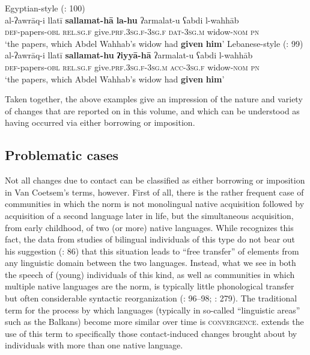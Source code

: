 \documentclass[output=paper]{langsci/langscibook}
\begin{document}
\ea
\label{introwilmsen1}Egyptian-style  (\citealt{Wilmsen2010}: 100)\\
\gll al-ʔawrāq-i llatī \textbf{sallamat-hā} \textbf{la-hu} ʔarmalat-u ʕabdi l-wahhāb\\
     \textsc{def}{}-papers-\textsc{obl} \textsc{rel.sg.f} give.\textsc{prf.3sg.f-3sg.f} \textsc{dat-3sg.m} widow-\textsc{nom} \textsc{pn}\\
     \glt ‘the papers, which Abdel Wahhab’s widow had \textbf{given} \textbf{him}’
\ex \label{introwilmsen2}Lebanese-style  (\citealt{Wilmsen2010}: 99)\\
\gll al-ʔawrāq-i llatī \textbf{sallamat-hu} \textbf{ʔiyyā-hā} ʔarmalat-u ʕabdi l-wahhāb\\
     \textsc{def}{}-papers-\textsc{obl} \textsc{rel.sg.f} give.\textsc{prf.3sg.f-3sg.m} \textsc{acc-3sg.f} widow-\textsc{nom} \textsc{pn}\\
\glt ‘the papers, which Abdel Wahhab’s widow had \textbf{given} \textbf{him}’\z

Taken together, the above examples give an impression of the nature and variety of changes that are reported on in this volume, and which can be understood as having occurred via either borrowing or {imposition}.

\subsection{Problematic cases}\label{introproblem}

Not all changes due to contact can be classified as either borrowing or {imposition} in Van Coetsem's terms, however. First of all, there is the rather frequent case of communities in which the norm is not {monolingual} native acquisition followed by acquisition of a second language later in life, but the simultaneous acquisition, from early childhood, of two (or more) native languages. While \citet{VanCoetsem2000} recognizes this fact, the data from studies of bilingual individuals of this type do not bear out his suggestion (\citeyear{VanCoetsem2000}: 86) that this situation leads to ``free {transfer}'' of elements from any linguistic domain between the two languages. Instead, what we see in both the speech of (young) individuals of this kind, as well as communities in which multiple native languages are the norm, is typically little phonological {transfer} but often considerable syntactic reorganization (\citealt{Lucas2009}: 96--98; \citeyear{Lucas2012}: 279). The traditional term for the process by which languages (typically in so-called ``linguistic areas'' such as the Balkans) become more similar over time is \textsc{convergence}. \citet{Lucas2015} extends the use of this term to specifically those contact-induced changes brought about by individuals with more than one native language.
\end{document}
